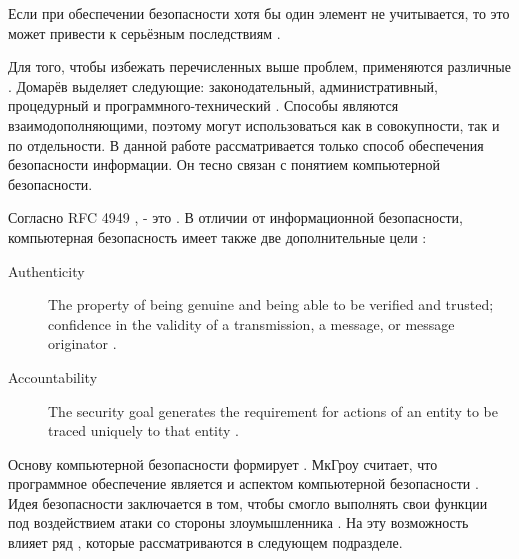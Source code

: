%
Если при обеспечении безопасности хотя бы один элемент  не учитывается, то это может привести к серьёзным последствиям .
%
%
%

%
Для того, чтобы избежать перечисленных выше проблем, применяются различные .
%
Домарёв выделяет следующие: законодательный, административный, процедурный и программного-технический . 
%
Способы являются взаимодополняющими, поэтому могут использоваться как в совокупности, так и по отдельности. 
%
В данной работе рассматривается только  способ обеспечения безопасности информации.
%
Он тесно связан с понятием компьютерной безопасности.

%
Согласно RFC 4949 ,  - это .
%
В отличии от информационной безопасности, компьютерная безопасность имеет также две дополнительные цели : 
%
\begin{description}

	\item[Authenticity] The property of being genuine and being able to be verified and trusted; confidence in the validity of a transmission, a message, or message originator .

	\item[Accountability] The security goal generates the requirement for actions of an entity to be traced uniquely to that entity .
\end{description}

%
Основу компьютерной безопасности формирует .
%
МкГроу считает, что программное обеспечение является  и  аспектом компьютерной безопасности . 
%
Идея безопасности  заключается в том, чтобы  смогло  выполнять свои функции под воздействием атаки со стороны злоумышленника .
%
На эту возможность влияет ряд , которые рассматриваются в следующем подразделе.
